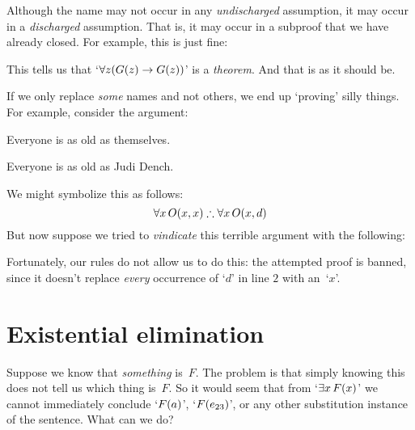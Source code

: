 Although the name may not occur in any \emph{undischarged} assumption, it may occur in a \emph{discharged} assumption. That is, it may occur in a subproof that we have already closed. For example, this is just fine:
\begin{fitchproof}
	\open
		\AS
	\close
\end{fitchproof}
This tells us that `$\forall z (G(z) \rightarrow G(z))$' is a \emph{theorem}. And that is as it should be.

If we only replace \emph{some} names and not others, we end up
`proving' silly things. For example, consider the argument:
	\begin{earg}
	\item Everyone is as old as themselves.
	\item[\texttherefore] Everyone is as old as Judi Dench.
	\end{earg}
We might symbolize this as follows:
$$\forall x\,\atom{O}{x,x} \therefore \forall x\,\atom{O}{x,d}$$
But now suppose we tried to \emph{vindicate} this terrible argument with the following:
\begin{fitchproof}
	\PR
\end{fitchproof}
Fortunately, our rules do not allow us to do this: the attempted proof
is banned, since it doesn't replace \emph{every} occurrence of `$d$'
in line $2$ with an~`$x$'.

\section{Existential elimination}\label{s:existsElim}

Suppose we know that \emph{something} is~$F$. The problem is that simply knowing this does not tell us which thing is~$F$. So it would seem that from `$\exists x\,F(x)$' we cannot immediately conclude `$F(a)$', `$F(e_{23})$', or any other substitution instance of the sentence. What can we do?

